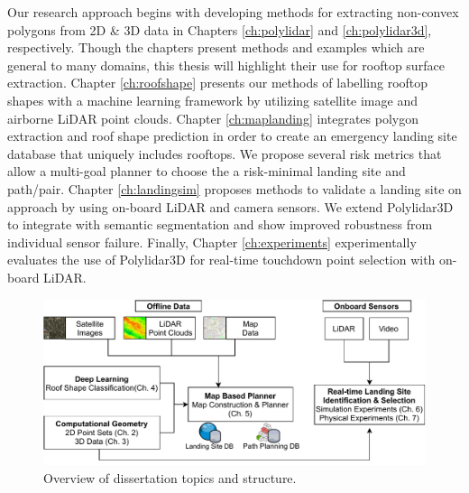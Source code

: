 Our research approach begins with developing methods for extracting non-convex polygons from 2D \& 3D data in Chapters \ref{ch:polylidar} and \ref{ch:polylidar3d}, respectively. Though the chapters present methods and examples which are general to many domains, this thesis will highlight their use for rooftop surface extraction. Chapter \ref{ch:roofshape} presents our methods of labelling rooftop shapes with a machine learning framework by utilizing satellite image and airborne LiDAR point clouds.  Chapter \ref{ch:maplanding} integrates polygon extraction and roof shape prediction in order to create an emergency landing site database that uniquely includes rooftops. We propose several risk metrics that allow a multi-goal planner to choose the a risk-minimal landing site and path/pair. Chapter \ref{ch:landingsim} proposes methods to validate a landing site on approach by using on-board LiDAR and camera sensors. We extend Polylidar3D to integrate with semantic segmentation and show improved robustness from individual sensor failure. Finally, Chapter \ref{ch:experiments} experimentally evaluates the use of Polylidar3D for real-time touchdown point selection with on-board LiDAR.

\begin{figure}[t]
    \centering
    \includegraphics[width=0.80\linewidth]{chapter_1_intro/imgs/Challenge_Overview-thesis_overview-v2.pdf}
    \caption{Overview of dissertation topics and structure.}
    \label{fig:ch1_thesis_overview}
\end{figure}




